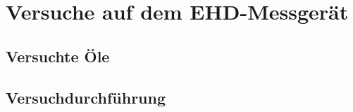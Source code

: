 \chapter{Versuche auf dem EHD-Messgerät}
\label{chap:versuche_auf_dem_ehd_messgeraet}
%
\section{Versuchte Öle}
\label{sec:versuchte_oele}

\section{Versuchdurchführung}
\label{sec:versuchdurchfuehrung}
